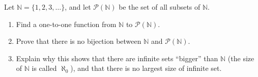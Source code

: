 Let $\mathbb N=\{1,2,3,\dots\}$, and let $\mathcal P(\mathbb N)$ be the set of all subsets of $\mathbb N$.
\begin{enumerate}
\item[(a)] Find a one-to-one function from $\mathbb N$ to $\mathcal P(\mathbb N)$.
\item[(b)] Prove that there is no bijection between $\mathbb N$ and $\mathcal P(\mathbb N)$.
\item[(c)] Explain why this shows that there are infinite sets ``bigger'' than $\mathbb N$ (the size of $\mathbb N$ is called $\aleph_0$), and that there is no largest size of infinite set.
\end{enumerate}
